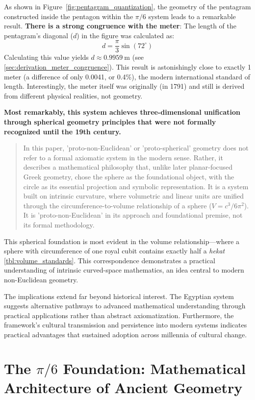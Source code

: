 \documentclass[11pt]{article}
\begin{document}
As shown in Figure~\ref{fig:pentagram_quantization}, the geometry of the pentagram constructed inside the pentagon within the $\pi/6$ system leads to a remarkable result. 
\textbf{There is a strong congruence with the meter}: The length of the pentagram's diagonal ($d$) in the figure was calculated as:
\[
d = \frac{\pi}{3} \sin(72^\circ)
\]
Calculating this value yields $d \approx \SI{0.9959}{\meter}$ (see \ref{sec:derivation_meter_congruence}). This result is astonishingly close to exactly 1 meter (a difference of only 0.0041, or 0.4\%), the modern international standard of length. Interestingly, the meter itself was originally (in 1791) and still is derived from different physical realities, not geometry.

\textbf{Most remarkably, this system achieves three-dimensional unification through spherical geometry principles that were not formally recognized until the 19th century.}
\begin{quote}
In this paper, 'proto-non-Euclidean' or 'proto-spherical' geometry does not refer to a formal axiomatic system in the modern sense. Rather, it describes a mathematical philosophy that, unlike later planar-focused Greek geometry, chose the sphere as the foundational object, with the circle as its essential projection and symbolic representation. It is a system built on intrinsic curvature, where volumetric and linear units are unified through the circumference-to-volume relationship of a sphere ($V = c^3/6\pi^2$). It is 'proto-non-Euclidean' in its approach and foundational premise, not its formal methodology.
\end{quote}

This spherical foundation is most evident in the volume relationship—where a sphere with circumference of one royal cubit contains exactly half a \textit{hekat} \ref{tbl:volume_standards}. This correspondence demonstrates a practical understanding of intrinsic curved-space mathematics, an idea central to modern non-Euclidean geometry.

The implications extend far beyond historical interest. The Egyptian system suggests alternative pathways to advanced mathematical understanding through practical applications rather than abstract axiomatization. Furthermore, the framework's cultural transmission and persistence into modern systems indicates practical advantages that sustained adoption across millennia of cultural change.

\section{The \texorpdfstring{$\pi/6$}{pi/6} Foundation: Mathematical Architecture of Ancient Geometry}
\end{document}
